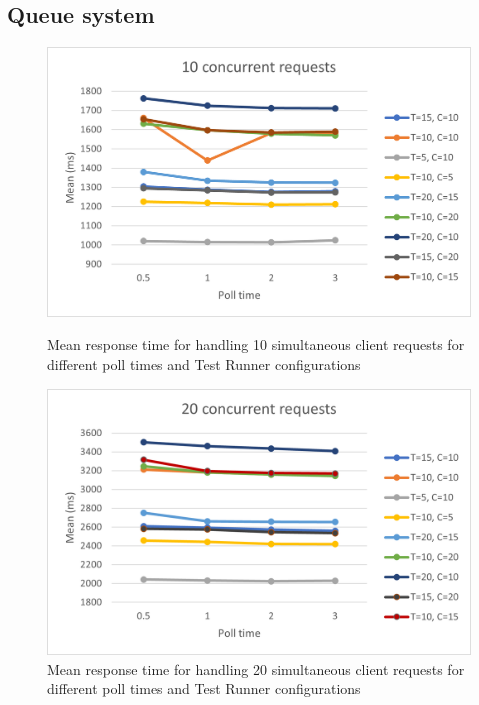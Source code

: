\subsection{Queue system}
\begin{figure}[!tbp]
  \centering
  \begin{minipage}[t]{0.4\textwidth}
    \includegraphics[scale=0.65]{images/10.png}
    \caption{Mean response time for handling 10 simultaneous client requests for different poll times and Test Runner configurations}
  \end{minipage}
  \label{fig:resultstart}
  \hfill
  \begin{minipage}[t]{0.4\textwidth}
    \centering
    \includegraphics[scale=0.65]{images/20.png}
    \caption{Mean response time for handling 20 simultaneous client requests for different poll times and Test Runner configurations}
  \end{minipage}
  \begin{minipage}[t]{0.4\textwidth}

\end{minipage}
\end{figure}
